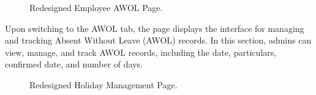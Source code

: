     \begin{figure}[H]
        \centering
        \caption{Redesigned Employee AWOL Page.}
        \label{fig:leave-awol}
    \end{figure}

    Upon switching to the AWOL tab, the page displays the interface for managing and tracking Absent Without Leave (AWOL) records. In this section, admins can view, manage, and track AWOL records, including the date, particulars, confirmed date, and number of days.

    \begin{figure}[H]
        \centering
        \caption{Redesigned Holiday Management Page.}
        \label{fig:holiday}
    \end{figure}

